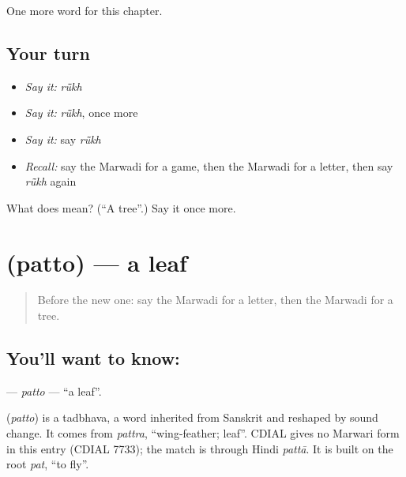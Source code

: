 \begin{grammarlens}[title={What you've built}]
One more word for this chapter.
\end{grammarlens}

\subsection*{Your turn}
\begin{itemize}
\raggedright
  \item \emph{Say it:} \emph{rū̃kh}
  \item \emph{Say it:} \emph{rū̃kh}, once more
  \item \emph{Say it:} say \emph{rū̃kh}
  \item \emph{Recall:} say the Marwadi for a game, then the Marwadi for a letter, then say \emph{rū̃kh} again
\end{itemize}

\begin{tcolorbox}[breakable,colback=teal!4,colframe=teal!35!black,title={Before you move on}]
What does  mean? (\textquotedblleft{}A tree\textquotedblright{}.) Say it once more.
\end{tcolorbox}
\section[\texorpdfstring{\mw{पत्तो} (patto)}{पत्तो (patto)}]{ (patto) — a leaf}

\label{lesson:MW-C67-patto}



\begin{quote}
Before the new one: say the Marwadi for a letter, then the Marwadi for a tree.
\end{quote}

\subsection*{You'll want to know: }
\textbf{} — \emph{patto} — \textquotedblleft{}a leaf\textquotedblright{}.

\begin{cousinweb}
\textbf{} (\emph{patto}) is a tadbhava, a word inherited from Sanskrit and reshaped by sound change. It comes from \emph{pattra}, \textquotedblleft{}wing-feather; leaf\textquotedblright{}. CDIAL gives no Marwari form in this entry (CDIAL 7733); the match is through Hindi \emph{pattā}. It is built on the root \emph{pat}, \textquotedblleft{}to fly\textquotedblright{}.
\end{cousinweb}

